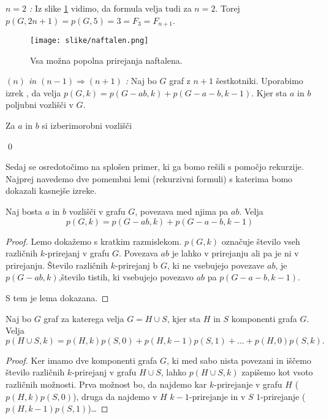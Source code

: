 \documentclass[mat1, tisk]{fmfdelo}
\begin{document}
\emph{ $n = 2$ :} 
Iz slike \ref{fig:naftalen} vidimo, da formula velja tudi 
za $n = 2$. 
Torej $p(G,2n+1) = p(G,5) = 3 = F_{3} = F_{n+1}$.
\begin{figure}
  \centering
  \texttt{[image: slike/naftalen.png]}
  \caption{Vsa možna popolna prirejanja naftalena.}
  \label{fig:naftalen}
\end{figure}


\emph{$(n)$ in $(n-1) \Rightarrow (n+1)$ :}
Naj bo $G$ graf z $n+1$ šestkotniki. Uporabimo izrek %
, da velja $p(G,k) = p(G-ab,k) + p(G-a-b, k-1)$. Kjer sta $a$ in $b$
poljubni vozlišči v $G$.

Za $a$ in $b$ si izberimorobni vozlišči

\qed


Sedaj se osredotočimo na splošen primer,
ki ga bomo rešili s pomočjo rekurzije.
Najprej navedemo dve pomembni lemi (rekurzivni formuli)
s katerima bomo dokazali kasnejše izreke. 

\begin{lema}
  Naj bosta $a$ in $b$ vozlišči v grafu $G$, povezava med njima pa $ab$.
  Velja
    $$p(G,k) = p(G-ab,k) + p(G-a-b, k-1) $$
    \label{lema1}
\end{lema}
\begin{proof}
  Lemo dokažemo s kratkim razmislekom.
  $p(G,k)$ označuje število vseh različnih
  $k$-prirejanj v grafu $G$. 
  Povezava $ab$ je lahko v prirejanju ali pa je ni v prirejanju.
  Število različnih $k$-prirejanj b $G$, ki ne vsebujejo povezave $ab$,
  je $p(G-ab,k)$,število tistih, ki vsebujejo povezavo $ab$ pa $p(G-a-b, k-1)$.
  
  S tem je lema dokazana.
\end{proof}

\begin{lema}
  Naj bo $G$ graf za katerega velja $G = H \cup S$, 
  kjer sta $H$ in $S$ komponenti grafa $G$. Velja
  $$
  p(H \cup S, k) = p(H,k)p(S,0) + p(H,k-1)p(S,1) + \dots + p(H,0)p(S,k). 
  $$
  \label{lema2}
\end{lema}
\begin{proof}
  Ker imamo dve komponenti grafa $G$, ki med sabo nista povezani in
  iščemo število različnih $k$-prirejanj v grafu $H \cup S$,
  lahko $p(H \cup S, k)$ zapišemo kot vsoto različnih možnosti.
  Prva možnost bo, da najdemo kar $k$-prirejanje v grafu $H$ ($p(H,k)p(S,0)$),
  druga da najdemo v $H$ $k-1$-prirejanje in v $S$ $1$-prirejanje ($p(H,k-1)p(S,1)$)\dots
\end{proof}
\end{document}

